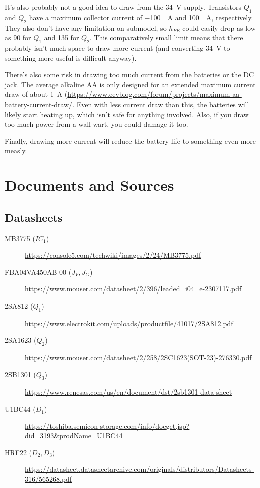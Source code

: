 \documentclass{article}
\newcommand{\model}{\textsf}
\begin{document}
It's also probably not a good idea to draw from the \qty{34}{\volt}
supply. Transistors $Q_1$ and $Q_2$ have a maximum collector current
of \qty{-100}{\milli{}A} and \qty{100}{\milli{}A}, respectively. They
also don't have any limitation on submodel, so $h_{FE}$ could easily
drop as low as 90 for $Q_1$ and 135 for $Q_2$. This comparatively
small limit means that there probably isn't much space to draw more
current (and converting \qty{34}{\volt} to something more useful is
difficult anyway).

There's also some risk in drawing too much current from the batteries
or the DC jack. The average alkaline AA is only designed for an
extended maximum current draw of about \qty{1}{A}
(\url{https://www.eevblog.com/forum/projects/maximum-aa-battery-current-draw/}.
Even with less current draw than this, the batteries will likely start
heating up, which isn't safe for anything involved. Also, if you draw
too much power from a wall wart, you could damage it too.

Finally, drawing more current will reduce the battery life to
something even more measly.

\section{Documents and Sources}
\label{sec:documents}
\subsection{Datasheets}
\begin{description}
\item[\model{MB3775} ($IC_1$)]
  \url{https://console5.com/techwiki/images/2/24/MB3775.pdf}
\item[\model{FBA04VA450AB-00} ($J_V,J_G$)]
  \url{https://www.mouser.com/datasheet/2/396/leaded_i04_e-2307117.pdf}
\item[\model{2SA812} ($Q_1$)]
  \url{https://www.electrokit.com/uploads/productfile/41017/2SA812.pdf}
\item[\model{2SA1623} ($Q_2$)]
  \url{https://www.mouser.com/datasheet/2/258/2SC1623(SOT-23)-276330.pdf}
\item[\model{2SB1301} ($Q_3$)]
  \url{https://www.renesas.com/us/en/document/dst/2sb1301-data-sheet}
\item[\model{U1BC44} ($D_1$)]
  \url{https://toshiba.semicon-storage.com/info/docget.jsp?did=3193&prodName=U1BC44}
  
\item[\model{HRF22} ($D_2,D_3$)]
  \url{https://datasheet.datasheetarchive.com/originals/distributors/Datasheets-316/565268.pdf}
\end{description}
\end{document}

